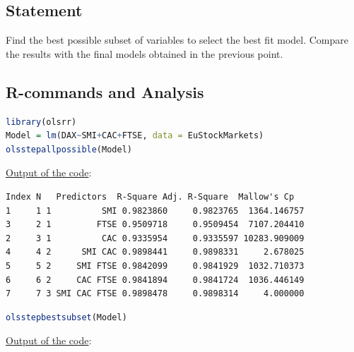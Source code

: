 \documentclass[a4paper, 11pt]{article}
\begin{document}
\subsection{Statement}
 Find the best possible subset of variables to select the best fit model.
Compare the results with the final models obtained in the previous point.
\subsection{R-commands and Analysis}
\begin{lstlisting}[language=R]
library(olsrr)
Model = lm(DAX~SMI+CAC+FTSE, data = EuStockMarkets)
olsstepallpossible(Model)

\end{lstlisting}
\underline{Output of the code}:
\small\begin{verbatim}
Index N   Predictors  R-Square Adj. R-Square  Mallow's Cp
1     1 1          SMI 0.9823860     0.9823765  1364.146757
3     2 1         FTSE 0.9509718     0.9509454  7107.204410
2     3 1          CAC 0.9335954     0.9335597 10283.909009
4     4 2      SMI CAC 0.9898441     0.9898331     2.678025
5     5 2     SMI FTSE 0.9842099     0.9841929  1032.710373
6     6 2     CAC FTSE 0.9841894     0.9841724  1036.446149
7     7 3 SMI CAC FTSE 0.9898478     0.9898314     4.000000
\end{verbatim}
\begin{lstlisting}[language=R]
olsstepbestsubset(Model)
\end{lstlisting}
\vspace{1em}
\underline{Output of the code}:
\begingroup \fontsize{2pt}{4pt}\selectfont
\end{document}
